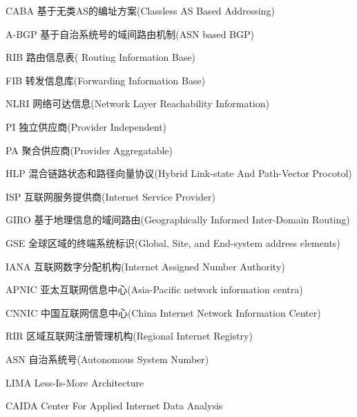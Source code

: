 \begin{denotation}

\item[CABA]  基于无类AS的编址方案(Classless AS Based Addressing)
\item[A-BGP] 基于自治系统号的域间路由机制(ASN based BGP)
\item[RIB] 路由信息表( Routing Information Base)
\item[FIB] 转发信息库(Forwarding Information Base)
\item[NLRI] 网络可达信息(Network Layer Reachability Information)
\item[PI] 独立供应商(Provider Independent)
\item[PA] 聚合供应商(Provider Aggregatable)
\item[HLP] 混合链路状态和路径向量协议(Hybrid Link-state And Path-Vector Procotol)
\item[ISP] 互联网服务提供商(Internet Service Provider)
\item[GIRO] 基于地理信息的域间路由(Geographically Informed Inter-Domain Routing)
\item[GSE] 全球区域的终端系统标识(Global, Site, and End-system address elements)
\item[IANA] 互联网数字分配机构(Internet Assigned Number Authority)
\item[APNIC] 亚太互联网信息中心(Asia-Pacific network information centra)
\item[CNNIC] 中国互联网信息中心(China Internet Network Information Center)
\item[RIR] 区域互联网注册管理机构(Regional Internet Registry)
\item[ASN] 自治系统号(Autonomous System Number)
\item[LIMA] Less-Is-More Architecture
\item[CAIDA] Center For Applied Internet Data Analysis

\end{denotation}
